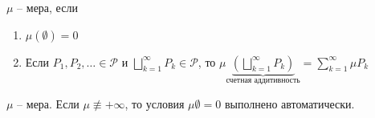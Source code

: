\begin{definition}
    $\mu$ -- мера, если 

    \begin{enumerate}
        \item $\mu(\emptyset) = 0$
        \item Если $P_1, P_2, \dots \in \mathcal{P}$ и $\bigsqcup_{k=1}^{\infty} P_k \in \mathcal{P}$, то $\mu \underbrace{\left(\bigsqcup_{k=1}^{\infty} P_k\right)}_{\text{счетная аддитивность}} = \sum_{k=1}^{\infty} \mu P_k$ 
    \end{enumerate}
\end{definition}

\begin{exerc}
    $\mu$ -- мера. Если $\mu \not \equiv +\infty$, то условия $\mu \emptyset = 0$ выполнено автоматически.
\end{exerc}

